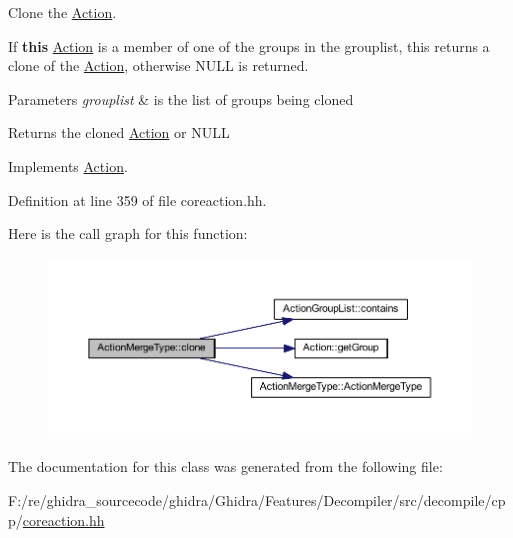 Clone the \mbox{\hyperlink{class_action}{Action}}. 

If {\bfseries{this}} \mbox{\hyperlink{class_action}{Action}} is a member of one of the groups in the grouplist, this returns a clone of the \mbox{\hyperlink{class_action}{Action}}, otherwise N\+U\+LL is returned. 
\begin{DoxyParams}{Parameters}
{\em grouplist} & is the list of groups being cloned \\
\hline
\end{DoxyParams}
\begin{DoxyReturn}{Returns}
the cloned \mbox{\hyperlink{class_action}{Action}} or N\+U\+LL 
\end{DoxyReturn}


Implements \mbox{\hyperlink{class_action_af8242e41d09e5df52f97df9e65cc626f}{Action}}.



Definition at line 359 of file coreaction.\+hh.

Here is the call graph for this function\+:
\nopagebreak
\begin{figure}[H]
\begin{center}
\leavevmode
\includegraphics[width=350pt]{class_action_merge_type_a40066f8b61af9229a6527967c4de0ead_cgraph}
\end{center}
\end{figure}


The documentation for this class was generated from the following file\+:\begin{DoxyCompactItemize}
\item 
F\+:/re/ghidra\+\_\+sourcecode/ghidra/\+Ghidra/\+Features/\+Decompiler/src/decompile/cpp/\mbox{\hyperlink{coreaction_8hh}{coreaction.\+hh}}\end{DoxyCompactItemize}
